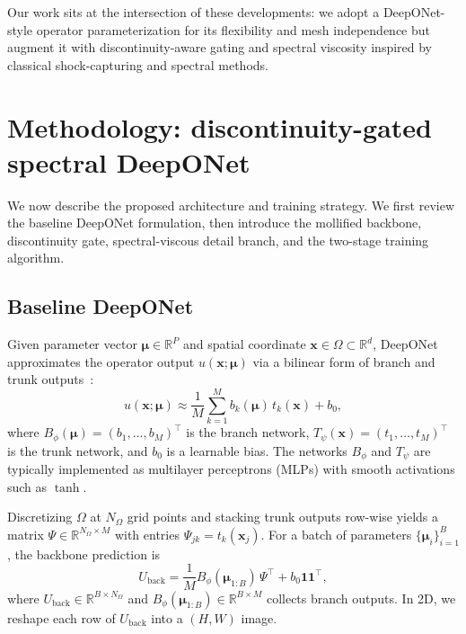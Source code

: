 \documentclass[a4paper,fleqn]{cas-dc}
\begin{document}
Our work sits at the intersection of these developments: we adopt a DeepONet-style operator parameterization for its flexibility and mesh independence but augment it with discontinuity-aware gating and spectral viscosity inspired by classical shock-capturing and spectral methods.

\section{Methodology: discontinuity-gated spectral DeepONet}
\label{sec:method}

We now describe the proposed architecture and training strategy.
We first review the baseline DeepONet formulation, then introduce the mollified backbone, discontinuity gate, spectral-viscous detail branch, and the two-stage training algorithm.

\subsection{Baseline DeepONet}

Given parameter vector $\boldsymbol{\mu} \in \mathbb{R}^P$ and spatial coordinate $\mathbf{x} \in \Omega \subset \mathbb{R}^d$, DeepONet approximates the operator output $u(\mathbf{x};\boldsymbol{\mu})$ via a bilinear form of branch and trunk outputs~\citep{Lu2021DeepONet}:
\begin{equation}
  u(\mathbf{x};\boldsymbol{\mu})
  \approx \frac{1}{M}\sum_{k=1}^M b_k(\boldsymbol{\mu})\, t_k(\mathbf{x}) + b_0,
  \label{eq:deeponet_scalar}
\end{equation}
where $B_\phi(\boldsymbol{\mu}) = (b_1,\dots,b_M)^\top$ is the branch network, $T_\psi(\mathbf{x}) = (t_1,\dots,t_M)^\top$ is the trunk network, and $b_0$ is a learnable bias.
The networks $B_\phi$ and $T_\psi$ are typically implemented as multilayer perceptrons (MLPs) with smooth activations such as $\tanh$.

Discretizing $\Omega$ at $N_\Omega$ grid points and stacking trunk outputs row-wise yields a matrix $\Psi \in \mathbb{R}^{N_\Omega\times M}$ with entries $\Psi_{jk} = t_k(\mathbf{x}_j)$.
For a batch of parameters $\{\boldsymbol{\mu}_i\}_{i=1}^B$, the backbone prediction is
\begin{equation}
  U_{\mathrm{back}} = \frac{1}{M} B_\phi(\boldsymbol{\mu}_{1:B})\, \Psi^\top + b_0 \mathbf{1}\mathbf{1}^\top,
  \label{eq:deeponet_matrix}
\end{equation}
where $U_{\mathrm{back}} \in \mathbb{R}^{B\times N_\Omega}$ and $B_\phi(\boldsymbol{\mu}_{1:B}) \in \mathbb{R}^{B\times M}$ collects branch outputs.
In 2D, we reshape each row of $U_{\mathrm{back}}$ into a $(H,W)$ image.
\end{document}
